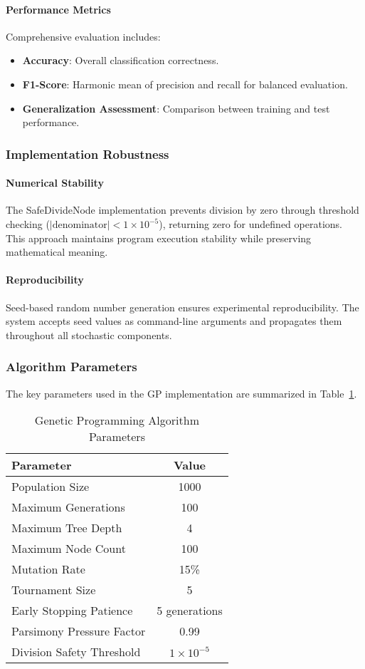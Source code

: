 \documentclass[a4paper,12pt]{article}
\begin{document}
\paragraph{Performance Metrics}
Comprehensive evaluation includes:
\begin{itemize}
    \item \textbf{Accuracy}: Overall classification correctness.
    \item \textbf{F1-Score}: Harmonic mean of precision and recall for balanced evaluation.
    \item \textbf{Generalization Assessment}: Comparison between training and test performance.
\end{itemize}

\subsubsection{Implementation Robustness}
\paragraph{Numerical Stability}
The SafeDivideNode implementation prevents division by zero through threshold checking ($|\text{denominator}| < 1 \times 10^{-5}$), returning zero for undefined operations. This approach maintains program execution stability while preserving mathematical meaning.

\paragraph{Reproducibility}
Seed-based random number generation ensures experimental reproducibility. The system accepts seed values as command-line arguments and propagates them throughout all stochastic components.

\subsubsection{Algorithm Parameters}
The key parameters used in the GP implementation are summarized in Table~\ref{tab:gp_parameters}.
\begin{table}[htbp]
\centering
\caption{Genetic Programming Algorithm Parameters}
\label{tab:gp_parameters}
\begin{tabular}{|l|c|}
\hline
\textbf{Parameter} & \textbf{Value} \\
\hline
Population Size & 1000 \\
Maximum Generations & 100 \\
Maximum Tree Depth & 4 \\
Maximum Node Count & 100 \\
Mutation Rate & 15\% \\
Tournament Size & 5 \\
Early Stopping Patience & 5 generations \\
Parsimony Pressure Factor & 0.99 \\
Division Safety Threshold & $1 \times 10^{-5}$ \\
\hline
\end{tabular}
\end{table}
\end{document}
